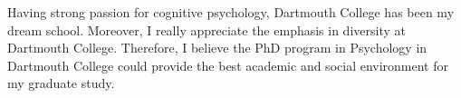 Having strong passion for cognitive psychology, Dartmouth College has been my dream school. Moreover, I really appreciate the emphasis in diversity at Dartmouth College. Therefore, I believe the PhD program in Psychology in Dartmouth College could provide the best academic and social environment for my graduate study.





